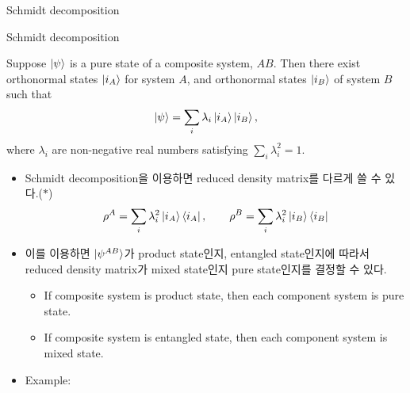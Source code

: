 \documentclass[9pt]{beamer}
\begin{document}
    \begin{section}{Schmidt decomposition}
        \begin{frame}{Schmidt decomposition}
            \begin{theorem}
                Suppose $\ket{\psi}$ is a pure state of a composite system, $AB$. Then there exist orthonormal states $\ket{i_A}$ for system $A$, and orthonormal states $\ket{i_B}$ of system $B$ such that 
                $$\ket{\psi} = \sum_i \lambda_i \ket{i_A} \ket{i_B},$$
                where $\lambda_i$ are non-negative real numbers satisfying $\sum_i \lambda_i^2 = 1$.
            \end{theorem}
            \begin{itemize}
                \item Schmidt decomposition을 이용하면 reduced density matrix를 다르게 쓸 수 있다.($\ast$)
                $$ \rho^A = \sum_i \lambda_i^2 \ket{i_A} \bra{i_A},\qquad \rho^B = \sum_i \lambda_i^2 \ket{i_B} \bra{i_B} $$
                \vspace{-0.3cm}
                \item 이를 이용하면 $\ket{\psi^{AB}}$가 product state인지, entangled state인지에 따라서 reduced density matrix가 mixed state인지 pure state인지를 결정할 수 있다.
                \begin{itemize}
                    \item If composite system is product state, then each component system is \alert{pure state}.
                    \item If composite system is entangled state, then each component system is \alert{mixed state}.
                \end{itemize}
                \item Example:
                \vspace{1.1cm}

            \end{itemize}
        \end{frame}


\end{section}
\end{document}
